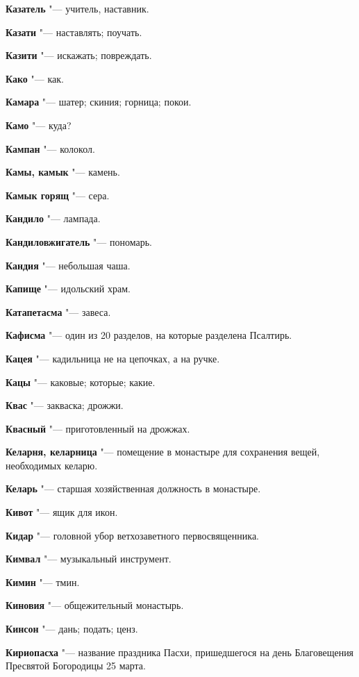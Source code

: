 \begin{mymulticols}
\noindent\textbf{Казатель} "--- учитель, наставник. 

\noindent\textbf{Казати} "--- наставлять; поучать. 

\noindent\textbf{Казити} "--- искажать; повреждать. 

\noindent\textbf{Како} "--- как. 

\noindent\textbf{Камара} "--- шатер; скиния; горница; покои. 

\noindent\textbf{Камо} "--- куда? 

\noindent\textbf{Кампан} "--- колокол. 

\noindent\textbf{Камы, камык} "--- камень. 

\noindent\textbf{Камык горящ} "--- сера. 

\noindent\textbf{Кандило} "--- лампада. 

\noindent\textbf{Кандиловжигатель} "--- пономарь. 

\noindent\textbf{Кандия} "--- небольшая чаша. 

\noindent\textbf{Капище} "--- идольский храм. 

\noindent\textbf{Катапетасма} "--- завеса. 

\noindent\textbf{Кафисма} "--- один из 20 разделов, на которые разделена Псалтирь. 

\noindent\textbf{Кацея} "--- кадильница не на цепочках, а на ручке. 

\noindent\textbf{Кацы} "--- каковые; которые; какие. 

\noindent\textbf{Квас} "--- закваска; дрожжи. 

\noindent\textbf{Квасный} "--- приготовленный на дрожжах. 

\noindent\textbf{Келарня, келарница} "--- помещение в монастыре для сохранения вещей, необходимых келарю. 

\noindent\textbf{Келарь} "--- старшая хозяйственная должность в монастыре. 

\noindent\textbf{Кивот} "--- ящик для икон. 

\noindent\textbf{Кидар} "--- головной убор ветхозаветного первосвященника. 

\noindent\textbf{Кимвал} "--- музыкальный инструмент. 

\noindent\textbf{Кимин} "--- тмин. 

\noindent\textbf{Киновия} "--- общежительный монастырь. 

\noindent\textbf{Кинсон} "--- дань; подать; ценз. 

\noindent\textbf{Кириопасха} "--- название праздника Пасхи, пришедшегося на день Благовещения Пресвятой Богородицы 25 марта. 


\end{mymulticols}
